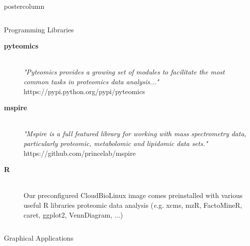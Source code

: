 \documentclass[final]{beamer}
\begin{document}
\begin{frame}
\begin{columns}
\begin{column}{.5\textwidth}
\begin{beamercolorbox}[center,wd=\textwidth]{postercolumn}
\begin{minipage}[T]{.95\textwidth}
{\begin{columns}
\begin{column}{.49\textwidth}
\begin{block}{Programming Libraries}
              \begin{description}
                 \item[\textbf{pyteomics}] \hfill \\
                  \textsl{"Pyteomics provides a growing set of modules to facilitate the most common tasks in proteomics data analysis..." }\\
                  https://pypi.python.org/pypi/pyteomics
                \item[\textbf{mspire}] \hfill \\
                  \textsl{"Mspire is a full featured library for working with mass spectrometry data, particularly proteomic, metabolomic and lipidomic data sets."} \\
                  https://github.com/princelab/mspire
                \item[\textbf{R}] \hfill \\
                  Our preconfigured CloudBioLinux image comes preinstalled with various useful R libraries proteomic data analysis
                  ({\textsl e.g. xcms, mzR, FactoMineR, caret, ggplot2, VennDiagram, ...})
              \end{description}
            \end{block}

              \end{column}
            \end{columns}
            \vfill
            \begin{block}{Graphical Applications}


\end{block}}
\end{minipage}
\end{beamercolorbox}
\end{column}
\end{columns}
\end{frame}
\end{document}
